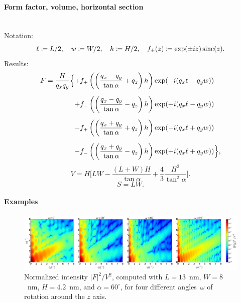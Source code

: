 \paragraph{Form factor, volume, horizontal section}\strut\\
Notation:
\begin{displaymath}
  \ell\coloneqq L/2,\quad
  w\coloneqq W/2,\quad
  h\coloneqq H/2,\quad
  f_\pm(z)\coloneqq \exp(\pm i z)\operatorname{sinc}(z).
\end{displaymath}
Results:
\begin{equation*}
\begin{array}{@{}l@{}l@{}}
\DS F=
\frac{H}{q_xq_y} \Big\{
   &+\DS  f_+\left(\left(\frac{q_x-q_y}{\tan\alpha} +q_z\right)h\right)
        \exp(-i(q_x\ell-q_y w))
\\[3.6ex]
   &\DS+ f_-\left(\left(\frac{q_x-q_y}{\tan\alpha} -q_z\right)h\right)
        \exp(+i(q_x\ell-q_y w))
\\[3.6ex]
   &\DS- f_+\left(\left(\frac{q_x+q_y}{\tan\alpha} +q_z\right)h\right)
        \exp(-i(q_x\ell+q_y w))
\\[3.6ex]
   &\DS- f_-\left(\left(\frac{q_x+q_y}{\tan\alpha} -q_z\right)h\right)
        \exp(+i(q_x\ell+q_y w))
\Big\},
\end{array}
\end{equation*}
\begin{equation*}
  V= H \Big[LW - \dfrac{(L + W)H}{\tan\alpha} + \dfrac{4}{3} \dfrac{H^2}{\tan^2\alpha}\Big].
\end{equation*}
\begin{equation*}
  S=LW.
\end{equation*}

\paragraph{Examples}\strut

\begin{figure}[H]
\begin{center}
\includegraphics[width=\textwidth]{fig/ff2/ff_AnisoPyramid.pdf}
\end{center}
\caption{Normalized intensity $|F|^2/V^2$,
computed with $L=13$~nm, $W=8$~nm, $H=4.2$~nm, and $\alpha=60^\circ$,
for four different angles~$\omega$ of rotation around the $z$ axis.}
\label{fig:FFAnisoPyramidEx}
\end{figure}

